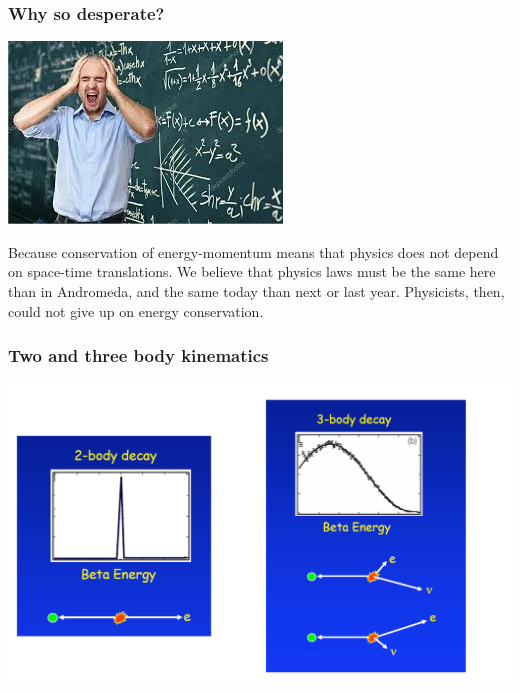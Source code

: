 \begin{frame}
\frametitle{Why so desperate?}

\includegraphics[scale=0.4]{img/desperate.png}
 

\begin{block}{}
Because conservation of energy-momentum means that physics does not depend on space-time translations. We believe that physics laws must be the same here than in Andromeda, and the same today than next or last year. Physicists, then, could not give up on energy conservation.

\end{block}

\end{frame}
%
%
\begin{frame}
\frametitle{Two and three body kinematics}

\includegraphics[scale=0.4]{img/kinematics.pdf}
 
\end{frame}
%
%
